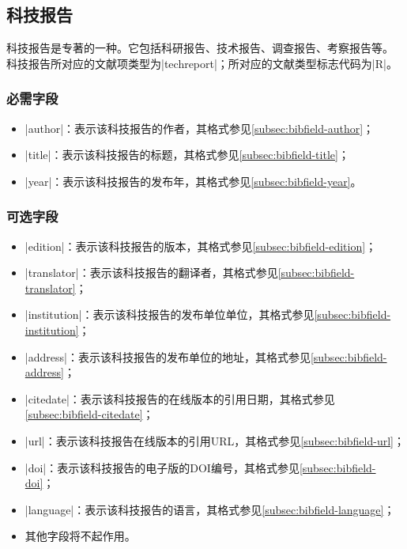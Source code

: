 \subsection{科技报告}\label{subsec:bibtype-techreport}

科技报告是专著的一种。它包括科研报告、技术报告、调查报告、考察报告等\cite{gbt3469-1983}。
科技报告所对应的{\BibTeX}文献项类型为|techreport|；所对应的文献类型标志代码为|R|\cite{gbt3469-1983}。

\subsubsection{必需字段}

\begin{itemize}
\item |author|：表示该科技报告的作者，其格式参见\ref{subsec:bibfield-author}；
\item |title|：表示该科技报告的标题，其格式参见\ref{subsec:bibfield-title}；
\item |year|：表示该科技报告的发布年，其格式参见\ref{subsec:bibfield-year}。
\end{itemize}

\subsubsection{可选字段}

\begin{itemize}
\item |edition|：表示该科技报告的版本，其格式参见\ref{subsec:bibfield-edition}；
\item |translator|：表示该科技报告的翻译者，其格式参见\ref{subsec:bibfield-translator}；
\item |institution|：表示该科技报告的发布单位单位，其格式参见\ref{subsec:bibfield-institution}；
\item |address|：表示该科技报告的发布单位的地址，其格式参见\ref{subsec:bibfield-address}；
\item |citedate|：表示该科技报告的在线版本的引用日期，其格式参见\ref{subsec:bibfield-citedate}；
\item |url|：表示该科技报告在线版本的引用URL，其格式参见\ref{subsec:bibfield-url}；
\item |doi|：表示该科技报告的电子版的DOI编号，其格式参见\ref{subsec:bibfield-doi}；
\item |language|：表示该科技报告的语言，其格式参见\ref{subsec:bibfield-language}；
\item 其他字段将不起作用。
\end{itemize}

